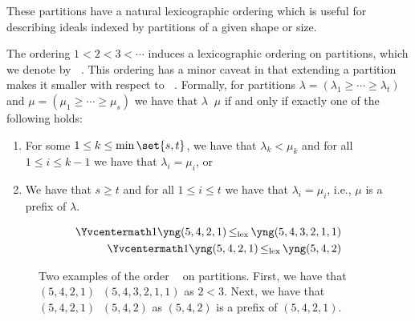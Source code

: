 \documentclass[10pt,a4paper]{amsart}
\newcommand*\ie{i.e.}
\DeclareMathOperator{\lex}{lex}
\DeclareMathOperator{\leqlex}{\leq_{\lex}}
\begin{document}
These partitions have a natural lexicographic ordering which is useful for describing ideals indexed by partitions of a given shape or size.
\begin{defn}\label{defn:lex}
    The ordering $1 < 2 < 3 < \cdots$ induces a lexicographic ordering on partitions, which we denote by $\leqlex$.
    This ordering has a minor caveat in that extending a partition makes it smaller with respect to $\leqlex$.
    Formally, for partitions $\lambda = (\lambda_1 \geq \cdots \geq \lambda_t)$ and $\mu = (\mu_1 \geq \cdots \geq \mu_s)$ we have that $\lambda \leqlex \mu$ if and only if exactly one of the following holds:
    \begin{enumerate}
        \item For some $1 \leq k \leq \min\set{s, t}$, we have that $\lambda_k < \mu_k$ and for all $1 \leq i \leq k - 1$ we have that $\lambda_i = \mu_i$, or
        \item We have that $s \geq t$ and for all $1 \leq i \leq t$ we have that $\lambda_i = \mu_i$, \ie, $\mu$ is a prefix of $\lambda$.
    \end{enumerate}
    \begin{figure}[H]
        \centering
        \begin{align*}
            \Yvcentermath1 \yng(5,4,2,1) \leqlex \yng(5,4,3,2,1,1) \\
            \Yvcentermath1 \yng(5,4,2,1) \leqlex \yng(5,4,2)           
        \end{align*}
        \caption{
            Two examples of the order $\leqlex$ on partitions.
            First, we have that $(5, 4, 2, 1) \leqlex (5, 4, 3, 2, 1, 1)$ as $2 < 3$.
            Next, we have that $(5, 4, 2, 1) \leqlex (5, 4, 2)$ as $(5, 4, 2)$ is a prefix of $(5, 4, 2, 1)$.
        }\label{fig:lex_examples}
    \end{figure} 
\end{defn}
\end{document}
